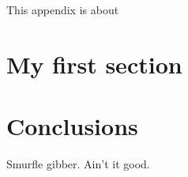 
This appendix is about

\section{My first section}
\label{sec:detail:myfirst}

\section{Conclusions}
\label{sec:detail:conclusions}

Smurfle gibber. Ain't it good.

